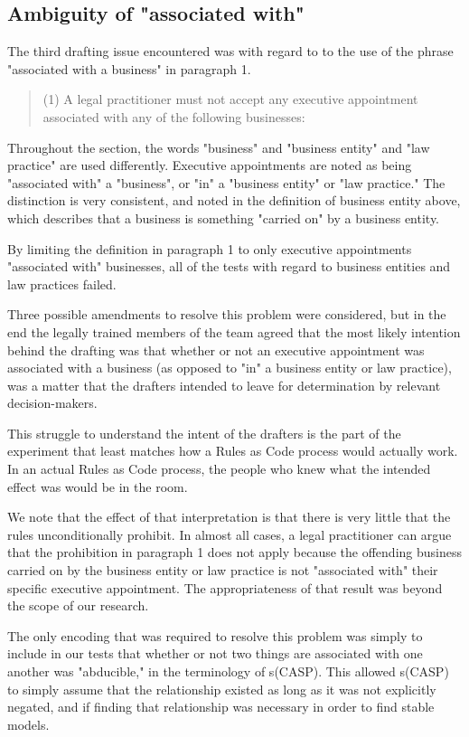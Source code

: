 \documentclass[sigconf]{acmart}
\begin{document}
\subsection{Ambiguity of "associated with"}

The third drafting issue encountered was with regard to to the use of the phrase
"associated with a business" in paragraph 1.

\begin{quote}
    (1)  A legal practitioner must not accept any executive appointment associated with any of the following businesses:
\end{quote}

Throughout the section, the words "business" and "business entity" and "law practice" are used differently.
Executive appointments are noted as being "associated with" a "business", or "in" a "business entity" or
"law practice."  The distinction is very consistent, and noted in the definition of business entity above,
which describes that a business is something "carried on" by a business entity.

By limiting the definition in paragraph 1 to only executive appointments "associated with" businesses, all of the
tests with regard to business entities and law practices failed.

Three possible amendments to resolve this problem were considered, but in the end
the legally trained members of the team agreed that the most likely intention
behind the drafting was that whether or not an executive appointment was associated
with a business (as opposed to "in" a business entity or law practice), was a matter
that the drafters intended to leave for determination by relevant decision-makers.

This struggle to understand the intent of the drafters is the part of the experiment
that least matches how a Rules as Code process would actually work. In an actual
Rules as Code process, the people who knew what the intended effect was would be
in the room.

We note that the effect of that interpretation is that there is very little
that the rules unconditionally prohibit. In almost all cases, a
legal practitioner can argue that the prohibition in paragraph 1 does not apply
because the offending business carried on by the business entity or law
practice is not "associated
with" their specific executive appointment. The appropriateness of that result
was beyond the scope of our research.

The only encoding that was required to resolve this problem was simply to include in
our tests that whether or not two things are associated
with one another was "abducible," in the terminology of s(CASP). This allowed
s(CASP) to simply assume that the relationship existed as long as it was not
explicitly negated, and if finding that relationship was necessary in order to find 
stable models.
\end{document}
